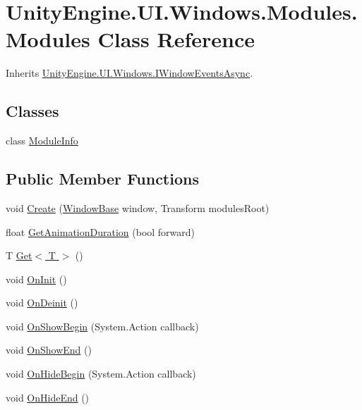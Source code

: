 \hypertarget{class_unity_engine_1_1_u_i_1_1_windows_1_1_modules_1_1_modules}{}\section{Unity\+Engine.\+U\+I.\+Windows.\+Modules.\+Modules Class Reference}
\label{class_unity_engine_1_1_u_i_1_1_windows_1_1_modules_1_1_modules}


Inherits \hyperlink{interface_unity_engine_1_1_u_i_1_1_windows_1_1_i_window_events_async}{Unity\+Engine.\+U\+I.\+Windows.\+I\+Window\+Events\+Async}.

\subsection*{Classes}
\begin{DoxyCompactItemize}
\item 
class \hyperlink{class_unity_engine_1_1_u_i_1_1_windows_1_1_modules_1_1_modules_1_1_module_info}{Module\+Info}
\end{DoxyCompactItemize}
\subsection*{Public Member Functions}
\begin{DoxyCompactItemize}
\item 
void \hyperlink{class_unity_engine_1_1_u_i_1_1_windows_1_1_modules_1_1_modules_a0c72e5ad21b58178f18ef70d6275bd75}{Create} (\hyperlink{class_unity_engine_1_1_u_i_1_1_windows_1_1_window_base}{Window\+Base} window, Transform modules\+Root)
\item 
float \hyperlink{class_unity_engine_1_1_u_i_1_1_windows_1_1_modules_1_1_modules_a7ff8633f0f200e020f2c6b1b492491c7}{Get\+Animation\+Duration} (bool forward)
\item 
T \hyperlink{class_unity_engine_1_1_u_i_1_1_windows_1_1_modules_1_1_modules_af4f91abab0ffb2b02b3648068b4201fe}{Get$<$ T $>$} ()
\item 
void \hyperlink{class_unity_engine_1_1_u_i_1_1_windows_1_1_modules_1_1_modules_a6be93b010de8970042b6ee7232bc3d73}{On\+Init} ()
\item 
void \hyperlink{class_unity_engine_1_1_u_i_1_1_windows_1_1_modules_1_1_modules_aa2909e616b3ab97a931597ad301cef79}{On\+Deinit} ()
\item 
void \hyperlink{class_unity_engine_1_1_u_i_1_1_windows_1_1_modules_1_1_modules_a1bccfc97ea0bea0a9531525208442c35}{On\+Show\+Begin} (System.\+Action callback)
\item 
void \hyperlink{class_unity_engine_1_1_u_i_1_1_windows_1_1_modules_1_1_modules_aa2b7b9aa3430d4719ade1d8b44863afc}{On\+Show\+End} ()
\item 
void \hyperlink{class_unity_engine_1_1_u_i_1_1_windows_1_1_modules_1_1_modules_ab7d801470c8a62cdc4bfc400381d8b8c}{On\+Hide\+Begin} (System.\+Action callback)
\item 
void \hyperlink{class_unity_engine_1_1_u_i_1_1_windows_1_1_modules_1_1_modules_aed46f50d3c22cc4968bad95f8a674446}{On\+Hide\+End} ()
\end{DoxyCompactItemize}


